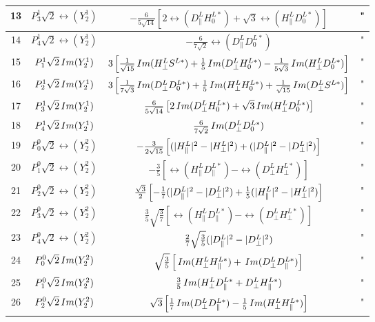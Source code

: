 \begin{tabular}{c|c|c|c}
 13  &   $P^1_3 \sqrt{2}\rel(Y^1_2)$ &  $-\frac{6}{5 \sqrt{14}} \left[2 \rel(D^L_\parallel H^{L\ast}_0)  + \sqrt{3} \rel(H^L_\parallel D^{L\ast}_0 ) \right] $ & " \\  \hline
 14  &   $P^1_4 \sqrt{2}\rel(Y^1_2)$ &  $- \frac{6}{7\sqrt{2}} \rel(D^L_\parallel D^{L\ast}_0)$  & " \\  \hline
 15  &   $P^1_1 \sqrt{2}\, Im(Y^1_2)$ &  $3 \left[ \frac{1}{\sqrt{15}} \, Im(H^L_\perp S^{L\ast}) + \frac{1}{5} \, Im(D^L_\perp H^{L\ast}_0) - \frac{1}{5 \sqrt{3}}  \, Im(H^L_\perp D^{L\ast}_0) \right]  $  & " \\  \hline
 16  &   $P^1_2 \sqrt{2}\, Im(Y^1_2)$ &  $ 3\left[ \frac{1}{7 \sqrt{3}} \, Im(D^L_\perp D^{L\ast}_0)  + \frac{1}{5} \, Im(H^L_\perp H^{L\ast}_0)  + \frac{1}{\sqrt{15}} \, Im(D^L_\perp S^{L\ast})   \right] $  & " \\  \hline
 17  &   $P^1_3 \sqrt{2}\, Im(Y^1_2)$ &  $\frac{6}{5 \sqrt{14}} \left[ 2 \, Im(D^L_\perp H^{L\ast}_0)  + \sqrt{3} \, Im(H^L_\perp D^{L\ast}_0) \right]  $   & " \\  \hline
 18  &   $P^1_4 \sqrt{2}\, Im(Y^1_2)$ &  $\frac{6}{7\sqrt{2}} \, Im(D^L_\perp D^{L\ast}_0)$  & " \\  \hline
 19  &   $P^0_0 \sqrt{2}\rel(Y^2_2)$ &  $-\frac{3}{2\sqrt{15}} \left[ (|H^L_\parallel|^2 - |H^L_\perp|^2) + (|D^L_\parallel|^2 - |D^L_\perp|^2) \right] $  & " \\  \hline
 20  &   $P^0_1 \sqrt{2}\rel(Y^2_2)$ &  $-\frac{3}{5} \left[ \rel(H^L_\parallel D^{L\ast}_\parallel)   - \rel(D^L_\perp H^{L\ast}_\perp) \right] $  & " \\  \hline
 21  &   $P^0_2 \sqrt{2}\rel(Y^2_2)$ &  $\frac{\sqrt{3}}{2} \left[ - \frac{1}{7} (|D^L_\parallel|^2 - |D^L_\perp|^2)   + \frac{1}{5} ( |H^L_\parallel|^2 - |H^L_\perp|^2 ) \right] $  & " \\  \hline
 22  &   $P^0_3 \sqrt{2}\rel(Y^2_2)$ &  $\frac{3}{5} \sqrt{ \frac{3}{7}} \left[ \rel(H^L_\parallel D^{L\ast}_\parallel)   - \rel(D^L_\perp H^{L\ast}_\perp) \right] $  & " \\  \hline
 23  &   $P^0_4 \sqrt{2}\rel(Y^2_2)$ &  $\frac{2}{7} \sqrt{ \frac{3}{5}}  (|D^L_\parallel|^2 - |D^L_\perp|^2) $ & " \\  \hline
 24  &   $P^0_0 \sqrt{2}\, Im(Y^2_2)$ &  $\sqrt{\frac{3}{5}} \left[ \, Im(H^L_\perp H^{L\ast}_\parallel) + \, Im(D^L_\perp D^{L\ast}_\parallel) \right] $   & " \\  \hline
 25  &   $P^0_1 \sqrt{2}\, Im(Y^2_2)$ &  $\frac{3}{5} \, Im(  H^L_\perp D^{L\ast}_\parallel +  D^L_\perp H^{L\ast}_\parallel )  $  & " \\ \hline
 26  &   $P^0_2 \sqrt{2}\, Im(Y^2_2)$ &  $ \sqrt{3} \left[\frac{1}{7} \, Im(D^L_\perp D^{L\ast}_\parallel)   - \frac{1}{5} \, Im(H^L_\perp H^{L\ast}_\parallel)\right] $  & " \\ \hline

\end{tabular}

